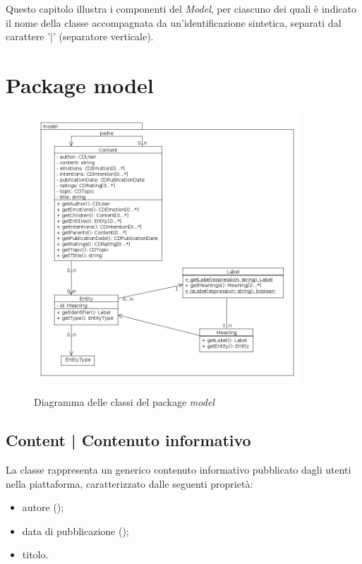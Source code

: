 \documentclass[10pt,a4paper,headinclude,footinclude,hidelinks]{scrreprt} %
\begin{document}
	Questo capitolo illustra i componenti del \textit{Model}, per ciascuno dei quali è indicato il nome della classe accompagnata da un'identificazione sintetica, separati dal carattere '|' (separatore verticale).

	\section{Package model}
	\label{sec:stage:design:model}

	\begin{figure}[ht]
		\begin{center}
	    	\includegraphics[width=10cm]{class/model.png}
			\label{gfx:package:model:model}
			\caption{Diagramma delle classi del package \textit{model}}
		\end{center}
	\end{figure}

	\subsection[Content]{Content | Contenuto informativo}
	\label{sec:stage:design:model:content}
	La classe rappresenta un generico contenuto informativo pubblicato dagli utenti nella piattaforma, caratterizzato dalle seguenti proprietà:
	\begin{itemize}
	\item autore (\textit{});
	\item data di pubblicazione (\textit{});
	\item titolo.
	\end{itemize}
\end{document}
